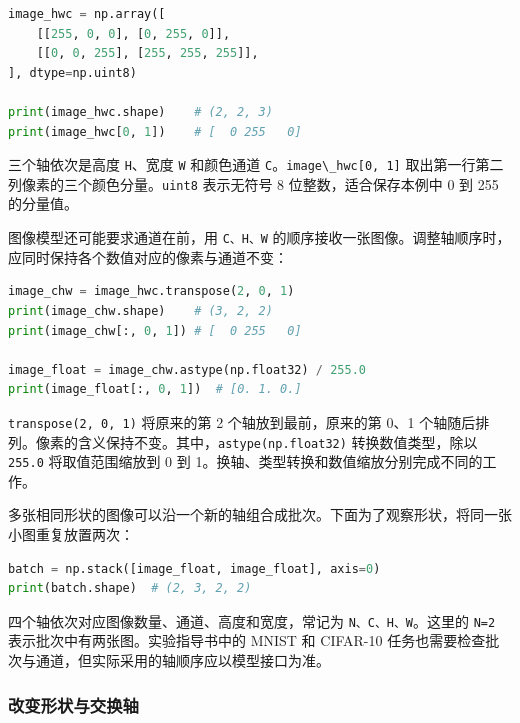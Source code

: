 \documentclass[UTF8,a4paper,11pt,fontset=fandol]{ctexart}
\providecommand{\passthrough}[1]{#1}
\begin{document}
\begin{lstlisting}[language=Python]
image_hwc = np.array([
    [[255, 0, 0], [0, 255, 0]],
    [[0, 0, 255], [255, 255, 255]],
], dtype=np.uint8)

print(image_hwc.shape)    # (2, 2, 3)
print(image_hwc[0, 1])    # [  0 255   0]
\end{lstlisting}

三个轴依次是高度 \passthrough{\lstinline!H!}、宽度 \passthrough{\lstinline!W!} 和颜色通道 \passthrough{\lstinline!C!}。\passthrough{\lstinline!image\_hwc[0, 1]!} 取出第一行第二列像素的三个颜色分量。\passthrough{\lstinline!uint8!} 表示无符号 8 位整数，适合保存本例中 0 到 255 的分量值。

图像模型还可能要求通道在前，用 \passthrough{\lstinline!C、H、W!} 的顺序接收一张图像。调整轴顺序时，应同时保持各个数值对应的像素与通道不变：

\begin{lstlisting}[language=Python]
image_chw = image_hwc.transpose(2, 0, 1)
print(image_chw.shape)    # (3, 2, 2)
print(image_chw[:, 0, 1]) # [  0 255   0]

image_float = image_chw.astype(np.float32) / 255.0
print(image_float[:, 0, 1])  # [0. 1. 0.]
\end{lstlisting}

\passthrough{\lstinline!transpose(2, 0, 1)!} 将原来的第 2 个轴放到最前，原来的第 0、1 个轴随后排列。像素的含义保持不变。其中，\passthrough{\lstinline!astype(np.float32)!} 转换数值类型，除以 \passthrough{\lstinline!255.0!} 将取值范围缩放到 0 到 1。换轴、类型转换和数值缩放分别完成不同的工作。

多张相同形状的图像可以沿一个新的轴组合成批次。下面为了观察形状，将同一张小图重复放置两次：

\begin{lstlisting}[language=Python]
batch = np.stack([image_float, image_float], axis=0)
print(batch.shape)  # (2, 3, 2, 2)
\end{lstlisting}

四个轴依次对应图像数量、通道、高度和宽度，常记为 \passthrough{\lstinline!N、C、H、W!}。这里的 \passthrough{\lstinline!N=2!} 表示批次中有两张图。实验指导书中的 MNIST 和 CIFAR-10 任务也需要检查批次与通道，但实际采用的轴顺序应以模型接口为准。

\clearpage

\subsubsection{改变形状与交换轴}\label{ux6539ux53d8ux5f62ux72b6ux4e0eux4ea4ux6362ux8f74}
\end{document}
